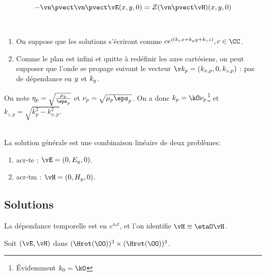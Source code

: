 \begin{equation}
\label{eq:coeff_ref:intro:ci}
-\vn \pvect \vn \pvect \vE(\x,\y,0) = \mathcal{Z}( \vn \pvect \vH)(\x,\y,0)
\end{equation}

\begin{hyp}{}~\\
\begin{enumerate}
    \item On suppose que les solutions s'écriront comme \(c e^{i(k_\x\x +k_\y\y+k_\z\z)}, c\in\CC\).
    \item Comme le plan est infini et quitte à redéfinir les axes cartésiens, on peut supposer que l'onde se propage suivant le vecteur \(\v k_p = (k_{\x,p},0,k_{\z,p})\) : pas de dépendance en \({y}\) et \(k_{y}\).
\end{enumerate}
\end{hyp}

On note \(\eta_p = \sqrt{\frac{\mu_p}{\eps_p}}\) et \(\nu_p = \sqrt{\mu_p \eps_p}\).
On a donc \(k_p = \kO\nu_p\)\footnote{Évidemment \(k_0 = \kO\)} et \(k_{z,p} = \sqrt{k_p^2 - k_{x,p}^2}\).

\begin{hyp}{}~\\
La solution générale est une combinaison linéaire de deux problèmes: 
\begin{enumerate}
    \item \gls{acr-te} : \(\vE = (0,E_y,0)\).
    \item \gls{acr-tm} : \(\vH = (0,H_y,0)\). 
\end{enumerate}
\end{hyp}

\subsection{Solutions}

\begin{tcolorbox}
\centering
La dépendance temporelle est en \(e^{i \omega t}\), et l'on identifie \(\vH \equiv \etaO \vH\).
\end{tcolorbox}


Soit \((\vE,\vH)\) dans \((\Hrot(\OO))^3 \times (\Hrot(\OO))^3\). 

